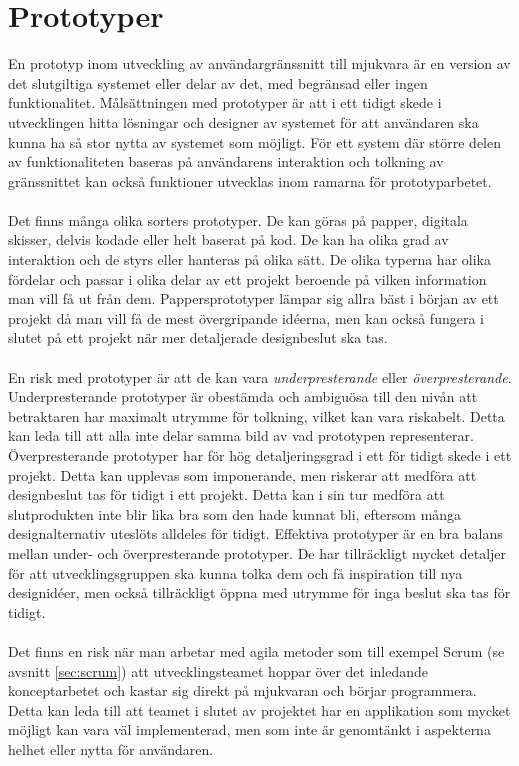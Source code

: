 \section{Prototyper}
\label{sec:prototypes-theory}
En prototyp inom utveckling av användargränssnitt till mjukvara är en version av det slutgiltiga systemet eller delar av det, med begränsad eller ingen funktionalitet. Målsättningen med prototyper är att i ett tidigt skede i utvecklingen hitta lösningar och designer av systemet för att användaren ska kunna ha så stor nytta av systemet som möjligt. \cite{arvolaboken} För ett system där större delen av funktionaliteten baseras på användarens interaktion och tolkning av gränssnittet kan också funktioner utvecklas inom ramarna för prototyparbetet.
\\ \\
Det finns många olika sorters prototyper. De kan göras på papper, digitala skisser, delvis kodade eller helt baserat på kod. De kan ha olika grad av interaktion och de styrs eller hanteras på olika sätt.
De olika typerna har olika fördelar och passar i olika delar av ett projekt beroende på vilken information man vill få ut från dem. Pappersprototyper lämpar sig allra bäst i början av ett projekt då man vill få de mest övergripande idéerna, men kan också fungera i slutet på ett projekt när mer detaljerade designbeslut ska tas.
\\ \\
En risk med prototyper är att de kan vara \textit{underpresterande} eller \textit{överpresterande}.
Underpresterande prototyper är obestämda och ambiguösa till den nivån att betraktaren har maximalt utrymme för tolkning, vilket kan vara riskabelt. Detta kan leda till att alla inte delar samma bild av vad prototypen representerar.
Överpresterande prototyper har för hög detaljeringsgrad i ett för tidigt skede i ett projekt. Detta kan upplevas som imponerande, men riskerar att medföra att designbeslut tas för tidigt i ett projekt. Detta kan i sin tur medföra att slutprodukten inte blir lika bra som den hade kunnat bli, eftersom många designalternativ uteslöts alldeles för tidigt. 
Effektiva prototyper är en bra balans mellan under- och överpresterande prototyper. De har tillräckligt mycket detaljer för att utvecklingsgruppen ska kunna tolka dem och få inspiration till nya designidéer, men också tillräckligt öppna med utrymme för inga beslut ska tas för tidigt. \cite{effective-prototyping}
\\ \\
Det finns en risk när man arbetar med agila metoder som till exempel Scrum (se avsnitt \ref{sec:scrum}) att utvecklingsteamet hoppar över det inledande konceptarbetet och kastar sig direkt på mjukvaran och börjar programmera. Detta kan leda till att teamet i slutet av projektet har en applikation som mycket möjligt kan vara väl implementerad, men som inte är genomtänkt i aspekterna helhet eller nytta för användaren. \cite{arvolaboken}

